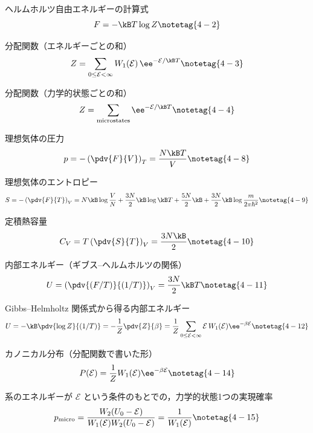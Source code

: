 \documentclass[uplatex,dvipdfmx,a4paper,11pt]{jsarticle}
\begin{document}
\begin{kirokuichiran}
\end{kirokuichiran}

\youtenseiri
\begin{noteshikilist}
  \item ヘルムホルツ自由エネルギーの計算式 %
  \[F=-\kB T\log Z \notetag{4-2}\]
  \item 分配関数（エネルギーごとの和） %
  \[Z=\sum_{0\le\mathcal{E}<\infty}W_{1}(\mathcal{E})\,\ee^{-\mathcal{E}/\kB T} \notetag{4-3}\]
  \item 分配関数（力学的状態ごとの和） %
  \[Z=\sum_{\text{microstates}}\ee^{-\mathcal{E}/\kB T} \notetag{4-4}\]
  \item 理想気体の圧力 %
  \[p=-\left(\pdv{F}{V}\right)_{T}=\frac{N\kB T}{V} \notetag{4-8}\]
  \item 理想気体のエントロピー %
  \[S=-\left(\pdv{F}{T}\right)_{V}=N\kB\log\frac{V}{N}+\frac{3N}{2}\kB\log\kB T+\frac{5N}{2}\kB+\frac{3N}{2}\kB\log\frac{m}{2\pi\hbar^{2}} \notetag{4-9}\]
  \item 定積熱容量 %
  \[C_{V}=T\left(\pdv{S}{T}\right)_{V}=\frac{3N\kB}{2} \notetag{4-10}\]
  \item 内部エネルギー（ギブス--ヘルムホルツの関係） %
  \[U=\left(\pdv{(F/T)}{(1/T)}\right)_{V}=\frac{3N}{2}\kB T \notetag{4-11}\]
  \item Gibbs--Helmholtz 関係式から得る内部エネルギー %
    \[ U=-\kB\pdv{\log Z}{(1/T)}=-\frac{1}{Z}\pdv{Z}{\beta}=\frac{1}{Z}\sum_{0\le\mathcal{E}<\infty}\mathcal{E}\,W_{1}(\mathcal{E})\ee^{-\beta\mathcal{E}} \notetag{4-12} \]
  \item カノニカル分布（分配関数で書いた形） %
    \[ P(\mathcal{E})=\frac{1}{Z}W_{1}(\mathcal{E})\ee^{-\beta\mathcal{E}} \notetag{4-14} \]
  \item 系のエネルギーが $\mathcal{E}$ という条件のもとでの，力学的状態1つの実現確率 %
    \[ p_{\mathrm{micro}}=\frac{W_{2}(U_{0}-\mathcal{E})}{W_{1}(\mathcal{E})W_{2}(U_{0}-\mathcal{E})}=\frac{1}{W_{1}(\mathcal{E})} \notetag{4-15} \]
\end{noteshikilist}
\end{document}

